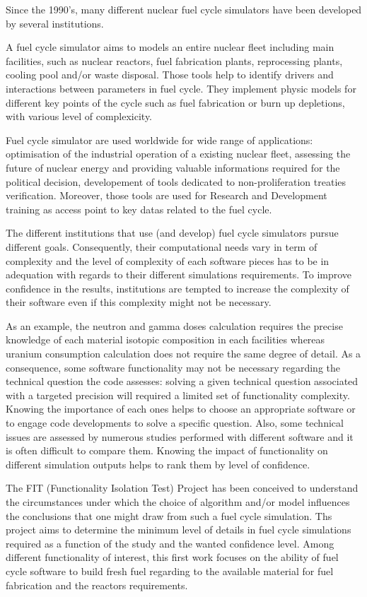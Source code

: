 Since the 1990's, many different nuclear fuel cycle simulators have been
developed by several institutions.

A fuel cycle simulator aims to models an entire nuclear fleet including main
facilities, such as nuclear reactors, fuel fabrication plants, reprocessing
plants, cooling pool and/or waste disposal. Those tools help to identify drivers
and interactions between parameters in fuel cycle. They implement physic models
for different key points of the cycle such as fuel fabrication or burn up
depletions, with various level of complexicity. 

Fuel cycle simulator are used worldwide for wide range of applications:
optimisation of the industrial operation of a existing nuclear fleet, assessing
the future of nuclear energy and providing valuable informations required for
the political decision, developement of tools dedicated to non-proliferation
treaties verification. Moreover, those tools are used for Research and
Development training as access point to key datas related to the fuel cycle. 

The different institutions that use (and develop) fuel cycle simulators pursue
different goals. Consequently, their computational needs vary in term of
complexity and the level of complexity of each software pieces has to be in
adequation with regards to their different simulations requirements. To improve
confidence in the results, institutions are tempted to increase the complexity
of their software even if this complexity might not be necessary.

As an example, the neutron and gamma doses calculation requires the precise
knowledge of each material isotopic composition in each facilities whereas
uranium consumption calculation does not require the same degree of detail. As a
consequence, some software functionality may not be necessary regarding the
technical question the code assesses: solving a given technical question
associated with a targeted precision will required a limited set of
functionality complexity. Knowing the importance of each ones helps to choose an
appropriate software or to engage code developments to solve a specific
question. Also, some technical issues are assessed by numerous studies performed
with different software and it is often difficult to compare them. Knowing the
impact of functionality on different simulation outputs helps to rank them by
level of confidence.

The FIT (Functionality Isolation Test) Project has been conceived to understand
the circumstances under which the choice of algorithm and/or model influences
the conclusions that one might draw from such a fuel cycle simulation. Ths
project aims to determine the minimum level of details in fuel cycle simulations
required as a function of the study and the wanted confidence level. Among
different functionality of interest, this first work focuses on the ability of
fuel cycle software to build fresh fuel regarding to the available material for
fuel fabrication and the reactors requirements.

